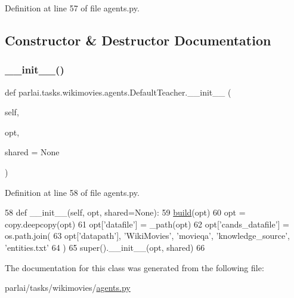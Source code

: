 Definition at line 57 of file agents.\+py.



\subsection{Constructor \& Destructor Documentation}
\mbox{\label{classparlai_1_1tasks_1_1wikimovies_1_1agents_1_1DefaultTeacher_a4bef6f1b4e0fff6a37c8ec1441cd9e6c}} 
\subsubsection{\texorpdfstring{\+\_\+\+\_\+init\+\_\+\+\_\+()}{\_\_init\_\_()}}
{\footnotesize\ttfamily def parlai.\+tasks.\+wikimovies.\+agents.\+Default\+Teacher.\+\_\+\+\_\+init\+\_\+\+\_\+ (\begin{DoxyParamCaption}\item[{}]{self,  }\item[{}]{opt,  }\item[{}]{shared = {\ttfamily None} }\end{DoxyParamCaption})}



Definition at line 58 of file agents.\+py.


\begin{DoxyCode}
58     \textcolor{keyword}{def }\_\_init\_\_(self, opt, shared=None):
59         \hyperlink{namespaceparlai_1_1mturk_1_1tasks_1_1talkthewalk_1_1download_a8c0fbb9b6dfe127cb8c1bd6e7c4e33fd}{build}(opt)
60         opt = copy.deepcopy(opt)
61         opt[\textcolor{stringliteral}{'datafile'}] = \_path(opt)
62         opt[\textcolor{stringliteral}{'cands\_datafile'}] = os.path.join(
63             opt[\textcolor{stringliteral}{'datapath'}], \textcolor{stringliteral}{'WikiMovies'}, \textcolor{stringliteral}{'movieqa'}, \textcolor{stringliteral}{'knowledge\_source'}, \textcolor{stringliteral}{'entities.txt'}
64         )
65         super().\_\_init\_\_(opt, shared)
66 \end{DoxyCode}


The documentation for this class was generated from the following file\+:\begin{DoxyCompactItemize}
\item 
parlai/tasks/wikimovies/\hyperlink{parlai_2tasks_2wikimovies_2agents_8py}{agents.\+py}\end{DoxyCompactItemize}
